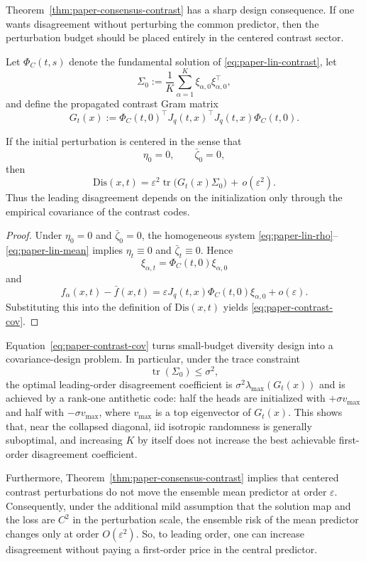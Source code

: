 Theorem~\ref{thm:paper-consensus-contrast} has a sharp design consequence. If one wants disagreement without perturbing the common predictor, then the perturbation budget should be placed entirely in the centered contrast sector.

Let $\Phi_C(t,s)$ denote the fundamental solution of \eqref{eq:paper-lin-contrast}, let
\[
\Sigma_0
:=
\frac{1}{K}\sum_{\alpha=1}^K \xi_{\alpha,0}\xi_{\alpha,0}^\top,
\]
and define the propagated contrast Gram matrix
\[
G_t(x)
:=
\Phi_C(t,0)^\top J_q(t,x)^\top J_q(t,x)\Phi_C(t,0).
\]

\begin{corollary}
\label{cor:paper-contrast-cov}
If the initial perturbation is centered in the sense that
\[
\eta_0=0,
\qquad
\bar\zeta_0=0,
\]
then
\begin{equation}
\mathrm{Dis}(x,t)
=
\varepsilon^2 \operatorname{tr}\!\bigl(G_t(x)\Sigma_0\bigr)
\,+\,
o(\varepsilon^2).
\label{eq:paper-contrast-cov}
\end{equation}
Thus the leading disagreement depends on the initialization only through the empirical covariance of the contrast codes.
\end{corollary}

\begin{proof}
Under $\eta_0=0$ and $\bar\zeta_0=0$, the homogeneous system \eqref{eq:paper-lin-rho}--\eqref{eq:paper-lin-mean} implies $\eta_t\equiv 0$ and $\bar\zeta_t\equiv 0$. Hence
\[
\xi_{\alpha,t}=\Phi_C(t,0)\xi_{\alpha,0}
\]
and
\[
f_\alpha(x,t)-\bar f(x,t)
=
\varepsilon J_q(t,x)\Phi_C(t,0)\xi_{\alpha,0} + o(\varepsilon).
\]
Substituting this into the definition of $\mathrm{Dis}(x,t)$ yields \eqref{eq:paper-contrast-cov}.
\end{proof}

Equation~\eqref{eq:paper-contrast-cov} turns small-budget diversity design into a covariance-design problem. In particular, under the trace constraint
\[
\operatorname{tr}(\Sigma_0)\le \sigma^2,
\]
the optimal leading-order disagreement coefficient is $\sigma^2\lambda_{\max}(G_t(x))$ and is achieved by a rank-one antithetic code: half the heads are initialized with $+\sigma v_{\max}$ and half with $-\sigma v_{\max}$, where $v_{\max}$ is a top eigenvector of $G_t(x)$. This shows that, near the collapsed diagonal, iid isotropic randomness is generally suboptimal, and increasing $K$ by itself does not increase the best achievable first-order disagreement coefficient.

Furthermore, Theorem~\ref{thm:paper-consensus-contrast} implies that centered contrast perturbations do not move the ensemble mean predictor at order $\varepsilon$. Consequently, under the additional mild assumption that the solution map and the loss are $C^2$ in the perturbation scale, the ensemble risk of the mean predictor changes only at order $O(\varepsilon^2)$. So, to leading order, one can increase disagreement without paying a first-order price in the central predictor.

